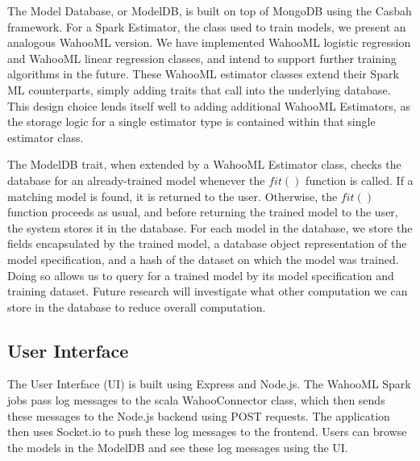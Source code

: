 \documentclass[../proposal.tex]{subfiles}
\begin{document}
The Model Database, or ModelDB, is built on top of MongoDB using the Casbah
framework. For a Spark Estimator, the class used to train models, we present an
analogous WahooML version. We have implemented WahooML logistic regression and
WahooML linear regression classes, and intend to support further training
algorithms in the future. These WahooML estimator classes extend their
Spark ML counterparts, simply adding traits that call into the underlying
database. This design choice lends itself well to adding additional WahooML
Estimators, as the storage logic for a single estimator type is contained
within that single estimator class. 

The ModelDB trait, when extended by a WahooML Estimator class, checks the
database for an already-trained model whenever the $fit()$ function is called.
If a matching model is found, it is returned to the user. Otherwise, the
$fit()$ function proceeds as usual, and before returning the trained model to
the user, the system stores it in the database. For each model in the database,
we store the fields encapsulated by the trained model, a database object
representation of the model specification, and a hash of the dataset on which
the model was trained. Doing so allows us to query for a trained model by its
model specification and training dataset. Future research will investigate what
other computation we can store in the database to reduce overall computation.

\subsection{User Interface}

The User Interface (UI) is built using Express and Node.js. The WahooML Spark
jobs pass log messages to the scala WahooConnector class, which then sends
these messages to the Node.js backend using POST requests. The application then
uses Socket.io to push these log messages to the frontend. Users can browse the
models in the ModelDB and see these log messages using the UI.
\end{document}
